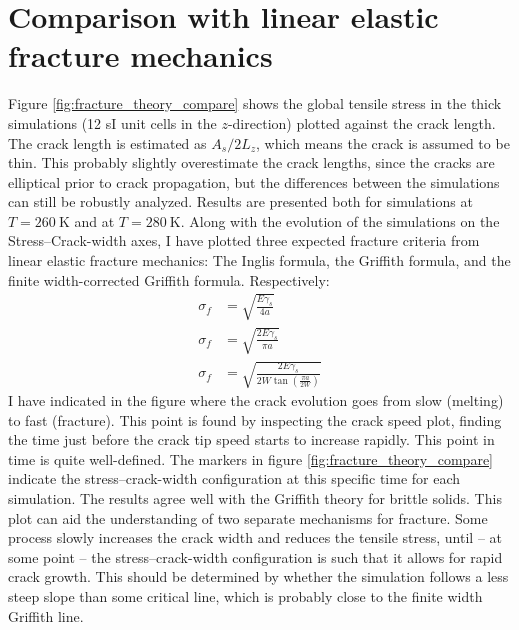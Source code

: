 \section{Comparison with linear elastic fracture mechanics}
Figure \ref{fig:fracture_theory_compare} shows the global tensile stress in the thick simulations (12 sI unit cells in the $z$-direction) plotted against the crack length. The crack length is estimated as $A_s/2L_z$, which means the crack is assumed to be thin. This probably slightly overestimate the crack lengths, since the cracks are elliptical prior to crack propagation, but the differences between the simulations can still be robustly analyzed. Results are presented both for simulations at $T= \SI{260}{\kelvin}$ and at $T=\SI{280}{\kelvin}$. Along with the evolution of the simulations on the Stress--Crack-width axes, I have plotted three expected fracture criteria from linear elastic fracture mechanics: The Inglis formula, the Griffith formula, and the finite width-corrected Griffith formula. Respectively:
\begin{align}
\sigma_f & = \sqrt{\frac{E\gamma_s}{4a}} \\
\sigma_f & = \sqrt{\frac{2E\gamma_s}{\pi a}} \\
\sigma_f & = \sqrt{\frac{2E\gamma_s}{2W\tan\left( \frac{\pi a}{2W}\right)}}
\end{align}
 I have indicated in the figure where the crack evolution goes from slow (melting) to fast (fracture). This point is found by inspecting the crack speed plot, finding the time just before the crack tip speed starts to increase rapidly. This point in time is quite well-defined. The markers in figure \ref{fig:fracture_theory_compare} indicate the stress--crack-width configuration at this specific time for each simulation. 
 The results agree well with the Griffith theory for brittle solids. This plot can aid the understanding of two separate mechanisms for fracture. Some process slowly increases the crack width and reduces the tensile stress, until -- at some point -- the stress--crack-width configuration is such that it allows for rapid crack growth. This should be determined by whether the simulation follows a less steep slope than some critical line, which is probably close to the finite width Griffith line.
%
